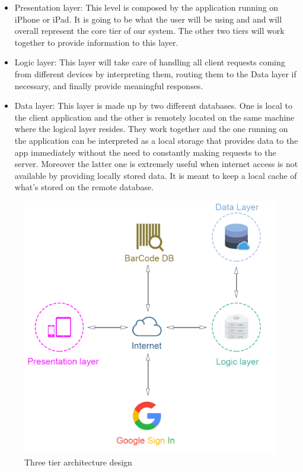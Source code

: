 \documentclass[paper=a4, fontsize=12pt]{scrartcl}
\numberwithin{equation}{section}		%
\numberwithin{figure}{section}			%
\numberwithin{table}{section}				%
\begin{document}
\begin{itemize}
\item Presentation layer: This level is composed by the application running on iPhone or iPad. It is going to be what the user will be using and and will overall represent the core tier of our system. The other two tiers will work together to provide information to this layer.
\item Logic layer: This layer will take care of handling all client requests coming from different devices by interpreting them, routing them to the Data layer if necessary, and finally provide meaningful responses.
\item Data layer: This layer is made up by two different databases. One is local to the client application and the other is remotely located on the same machine where the logical layer resides. They work together and the one running on the application can be interpreted as a local storage that provides data to the app immediately without the need to constantly making requests to the server. Moreover the latter one is extremely useful when internet access is not available by providing locally stored data. It is meant to keep a local cache of what's stored on the remote database.
\end{itemize}




\begin{figure}[H]
\begin{center}
    \includegraphics[width=0.8\linewidth]{architecture.png}
    \caption{Three tier architecture design}
    \label{Architecture}
\end{center}
\end{figure}
\end{document}
